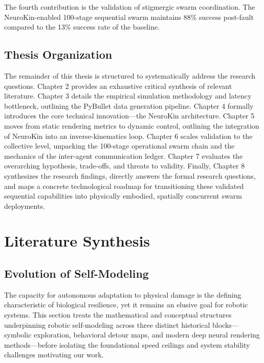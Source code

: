 \documentclass[12pt,a4paper,oneside]{report}
\begin{document}
The fourth contribution is the validation of stigmergic swarm coordination. The NeuroKin-enabled 100-stage sequential swarm maintains 88\% success post-fault compared to the 13\% success rate of the baseline.

\section{Thesis Organization}
\label{sec:thesis_organization_intro}

The remainder of this thesis is structured to systematically address the research questions. Chapter 2 provides an exhaustive critical synthesis of relevant literature. Chapter 3 details the empirical simulation methodology and latency bottleneck, outlining the PyBullet data generation pipeline. Chapter 4 formally introduces the core technical innovation---the NeuroKin architecture. Chapter 5 moves from static rendering metrics to dynamic control, outlining the integration of NeuroKin into an inverse-kinematics loop. Chapter 6 scales validation to the collective level, unpacking the 100-stage operational swarm chain and the mechanics of the inter-agent communication ledger. Chapter 7 evaluates the overarching hypothesis, trade-offs, and threats to validity. Finally, Chapter 8 synthesizes the research findings, directly answers the formal research questions, and maps a concrete technological roadmap for transitioning these validated sequential capabilities into physically embodied, spatially concurrent swarm deployments.

\clearpage

\chapter{Literature Synthesis}
\label{chap:literature_synthesis}

\section{Evolution of Self-Modeling}

The capacity for autonomous adaptation to physical damage is the defining characteristic of biological resilience, yet it remains an elusive goal for robotic systems. This section treats the mathematical and conceptual structures underpinning robotic self-modeling across three distinct historical blocks---symbolic exploration, behavioral detour maps, and modern deep neural rendering methods---before isolating the foundational speed ceilings and system stability challenges motivating our work.
\end{document}
